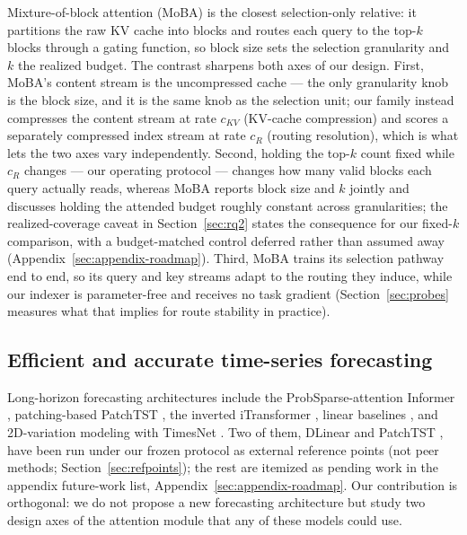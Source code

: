 Mixture-of-block attention (MoBA) \citep{lu2025moba} is the closest
selection-only relative: it partitions the raw KV cache into blocks and
routes each query to the top-$k$ blocks through a gating function, so block
size sets the selection granularity and $k$ the realized budget. The
contrast sharpens both axes of our design. First, MoBA's content stream is
the uncompressed cache --- the only granularity knob is the block size, and
it is the same knob as the selection unit; our family instead compresses
the content stream at rate $c_{KV}$ (KV-cache compression) and scores a
separately compressed index stream at rate $c_R$ (routing resolution),
which is what lets the two axes vary independently. Second, holding the
top-$k$ count fixed while $c_R$ changes --- our operating protocol ---
changes how many valid blocks each query actually reads, whereas MoBA
reports block size and $k$ jointly and discusses holding the attended
budget roughly constant across granularities; the realized-coverage
caveat in Section~\ref{sec:rq2} states the consequence for our fixed-$k$
comparison, with a budget-matched control deferred rather than assumed
away (Appendix~\ref{sec:appendix-roadmap}). Third, MoBA trains
its selection pathway end to end, so its query and key streams adapt to
the routing they induce, while our indexer is parameter-free and receives
no task gradient (Section~\ref{sec:probes} measures what that implies for
route stability in practice).

\subsection{Efficient and accurate time-series forecasting}
Long-horizon forecasting architectures include the ProbSparse-attention
Informer \citep{zhou2021informer}, patching-based PatchTST
\citep{nie2023patchtst}, the inverted iTransformer \citep{liu2024itransformer},
linear baselines \citep{zeng2023dlinear}, and 2D-variation modeling with
TimesNet \citep{wu2023timesnet}. Two of them, DLinear
\citep{zeng2023dlinear} and PatchTST \citep{nie2023patchtst}, have been run
under our frozen protocol as external reference points (not peer methods;
Section~\ref{sec:refpoints}); the rest are itemized as pending work in the
appendix future-work list, Appendix~\ref{sec:appendix-roadmap}. Our contribution is orthogonal: we do
not propose a new forecasting architecture but study two design axes of the
attention module that any of these models could use.

